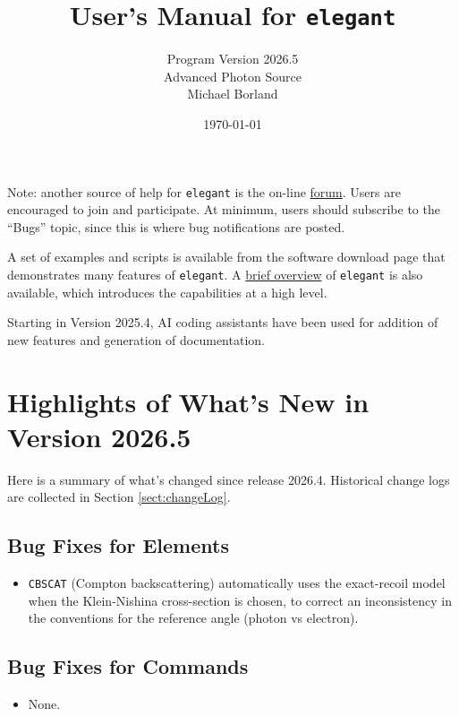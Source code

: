 \documentclass[11pt]{article}
\newcommand{\htmladdnormallink}[2]{\href{#2}{#1}}
\begin{document}
\title{User's Manual for {\tt elegant}}
\author{Program Version 2026.5\\Advanced Photon Source\\Michael Borland\\ \date{\today}}
\maketitle

Note: another source of help for {\tt elegant} is the on-line
\htmladdnormallink{forum}{https://www3.aps.anl.gov/forums/elegant/}.
Users are encouraged to join and participate.  At minimum, users should subscribe to the ``Bugs'' topic,
since this is where bug notifications are posted.

A set of examples and scripts is 
available from the software download page that demonstrates many features of {\tt elegant}.  A \htmladdnormallink{brief
overview}{https://ops.aps.anl.gov/elegant.html} of {\tt elegant} is also available, which introduces the capabilities
at a high level.

Starting in Version 2025.4, AI coding assistants have been used for addition of new features and generation
of documentation.

\section{Highlights of What's New in Version 2026.5}

Here is a summary of what's changed since release 2026.4.  Historical change logs are collected in Section
\ref{sect:changeLog}.

\subsection{Bug Fixes for Elements}

\begin{itemize}
\item \verb|CBSCAT| (Compton backscattering) automatically uses the exact-recoil model when the Klein-Nishina cross-section is chosen,
   to correct an inconsistency in the conventions for the reference angle (photon vs electron).
\end{itemize}

\subsection{Bug Fixes for Commands}
\begin{itemize}
\item None.
\end{itemize}
\end{document}
